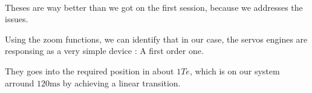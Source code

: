 \paragraph{}
Theses are way better than we got on the first session, because we addresses the issues.

Using the zoom functions, we can identify that in our case, the servos engines are responsing
as a very simple device : A first order one.

They goes into the required position in about $1 Te$, which is on our system arround 
$120 \si{\milli\second}$ by achieving a linear transition.



